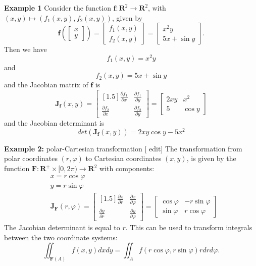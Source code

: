 \documentclass[13pt]{article}
\theoremstyle{definition}
\theoremstyle{remark}
\begin{document}
\textbf{Example 1}
Consider the function $\mathbf{f}: \mathbf{R}^2 \rightarrow \mathbf{R}^2$, with $(x, y) \mapsto\left(f_1(x, y), f_2(x, y)\right)$, given by
$$
\mathbf{f}\left(\left[\begin{array}{l}
x \\
y
\end{array}\right]\right)=\left[\begin{array}{l}
f_1(x, y) \\
f_2(x, y)
\end{array}\right]=\left[\begin{array}{c}
x^2 y \\
5 x+\sin y
\end{array}\right] .
$$
Then we have
$$
f_1(x, y)=x^2 y
$$
and
$$
f_2(x, y)=5 x+\sin y
$$
and the Jacobian matrix of $\mathbf{f}$ is
$$
\mathbf{J}_{\mathbf{f}}(x, y)=\begin{bmatrix}[1.5]
\frac{\partial f_1}{\partial x} & \frac{\partial f_1}{\partial y} \\
\frac{\partial f_2}{\partial x} & \frac{\partial f_2}{\partial y}
\end{bmatrix}=\left[\begin{array}{cc}
2 x y & x^2 \\
5 & \cos y
\end{array}\right]
$$
and the Jacobian determinant is
$$
det\left(\mathbf{J}_{\mathbf{f}}(x, y)\right)=2 x y \cos y-5 x^2
$$

\textbf{Example 2:} polar-Cartesian transformation [ edit]
The transformation from polar coordinates $(r, \varphi)$ to Cartesian coordinates $(x, y)$, is given by the function $\mathbf{F}: \mathbf{R}^{+} \times[0,2 \pi) \rightarrow \mathbf{R}^2$ with components:
$$
\begin{aligned}
& x=r \cos \varphi \\
& y=r \sin \varphi \\
& \mathbf{J}_{\mathbf{F}}(r, \varphi)=\begin{bmatrix}[1.5]
\frac{\partial x}{\partial r} & \frac{\partial x}{\partial \varphi} \\
\frac{\partial y}{\partial r} & \frac{\partial y}{\partial \varphi}
\end{bmatrix}=\left[\begin{array}{cc}
\cos \varphi & -r \sin \varphi \\
\sin \varphi & r \cos \varphi
\end{array}\right]
\end{aligned}
$$
The Jacobian determinant is equal to $r$. This can be used to transform integrals between the two coordinate systems:
$$
\iint_{\mathbf{F}(A)} f(x, y) d x d y=\iint_A f(r \cos \varphi, r \sin \varphi) r d r d \varphi .
$$
\end{document}
